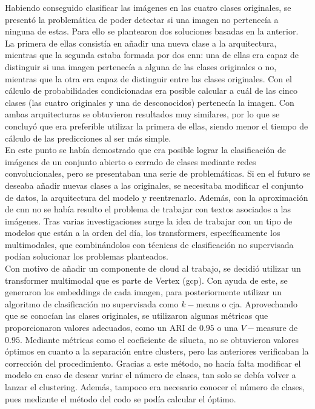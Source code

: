 	Habiendo conseguido clasificar las imágenes en las cuatro clases originales, se presentó la problemática de poder detectar si una imagen no pertenecía a ninguna de estas. Para ello se plantearon dos soluciones basadas en la anterior. La primera de ellas consistía en añadir una nueva clase a la arquitectura, mientras que la segunda estaba formada por dos \gls{cnn}: una de ellas era capaz de distinguir si una imagen pertenecía a alguna de las clases originales o no, mientras que la otra era capaz de distinguir entre las clases originales. Con el cálculo de probabilidades condicionadas era posible calcular a cuál de las cinco clases (las cuatro originales y una de desconocidos) pertenecía la imagen. Con ambas arquitecturas se obtuvieron resultados muy similares, por lo que se concluyó que era preferible utilizar la primera de ellas, siendo menor el tiempo de cálculo de las predicciones al ser más simple. \\
	
	En este punto se había demostrado que era posible lograr la clasificación de imágenes de un conjunto abierto o cerrado de clases mediante redes convolucionales, pero se presentaban una serie de problemáticas. Si en el futuro se deseaba añadir nuevas clases a las originales, se necesitaba modificar el conjunto de datos, la arquitectura del modelo y reentrenarlo. Además, con la aproximación de \gls{cnn} no se había resulto el problema de trabajar con textos asociados a las imágenes. Tras varias investigaciones surge la idea de trabajar con un tipo de modelos que están a la orden del día, los transformers, específicamente los multimodales, que combinándolos con técnicas de clasificación no supervisada podían solucionar los problemas planteados. \\
	
	Con motivo de añadir un componente de cloud al trabajo, se decidió utilizar un transformer multimodal que es parte de Vertex (\gls{gcp}). Con ayuda de este, se generaron los embeddings de cada imagen, para posteriormente utilizar un algoritmo de clasificación no supervisada como $k-$means o \gls{cja}. Aprovechando que se conocían las clases originales, se utilizaron algunas métricas que proporcionaron valores adecuados, como un ARI de $0.95$ o una $V-$measure de $0.95$. Mediante métricas como el coeficiente de silueta, no se obtuvieron valores óptimos en cuanto a la separación entre clusters, pero las anteriores verificaban la corrección del procedimiento. Gracias a este método, no hacía falta modificar el modelo en caso de desear variar el número de clases, tan solo se debía volver a lanzar el clustering. Además, tampoco era necesario conocer el número de clases, pues mediante el método del codo se podía calcular el óptimo. \\
	
